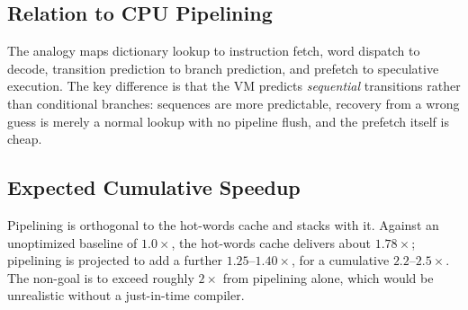 \subsection{Relation to CPU Pipelining}

The analogy maps dictionary lookup to instruction fetch, word dispatch to
decode, transition prediction to branch prediction, and prefetch to speculative
execution. The key difference is that the VM predicts \emph{sequential}
transitions rather than conditional branches: sequences are more predictable,
recovery from a wrong guess is merely a normal lookup with no pipeline flush,
and the prefetch itself is cheap.

\subsection{Expected Cumulative Speedup}

Pipelining is orthogonal to the hot-words cache and stacks with it. Against an
unoptimized baseline of $1.0\times$, the hot-words cache delivers about
$1.78\times$; pipelining is projected to add a further $1.25$--$1.40\times$, for
a cumulative $2.2$--$2.5\times$. The non-goal is to exceed roughly $2\times$
from pipelining alone, which would be unrealistic without a just-in-time
compiler.

